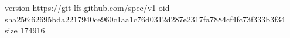 version https://git-lfs.github.com/spec/v1
oid sha256:62695bda2217940ce960c1aa1c76d0312d287e2317fa7884cf4fc73f333b3f34
size 174916
